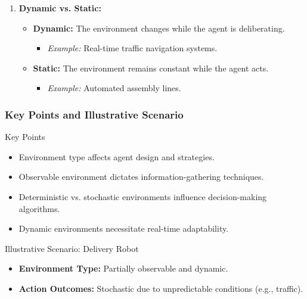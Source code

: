 \documentclass[aspectratio=169]{beamer}
\begin{document}
\begin{frame}[fragile]
\begin{enumerate}
        \item \textbf{Dynamic vs. Static:}
            \begin{itemize}
                \item \textbf{Dynamic:} The environment changes while the agent is deliberating.
                      \begin{itemize}
                          \item \textit{Example:} Real-time traffic navigation systems.
                      \end{itemize}
                \item \textbf{Static:} The environment remains constant while the agent acts.
                      \begin{itemize}
                          \item \textit{Example:} Automated assembly lines.
                      \end{itemize}
            \end{itemize}
    \end{enumerate}
\end{frame}

\begin{frame}[fragile]
    \frametitle{Key Points and Illustrative Scenario}
    \begin{block}{Key Points}
        \begin{itemize}
            \item Environment type affects agent design and strategies.
            \item Observable environment dictates information-gathering techniques.
            \item Deterministic vs. stochastic environments influence decision-making algorithms.
            \item Dynamic environments necessitate real-time adaptability.
        \end{itemize}
    \end{block}
    
    \begin{block}{Illustrative Scenario: Delivery Robot}
        \begin{itemize}
            \item \textbf{Environment Type:} Partially observable and dynamic.
            \item \textbf{Action Outcomes:} Stochastic due to unpredictable conditions (e.g., traffic).
        \end{itemize}
    \end{block}
\end{frame}
\end{document}
